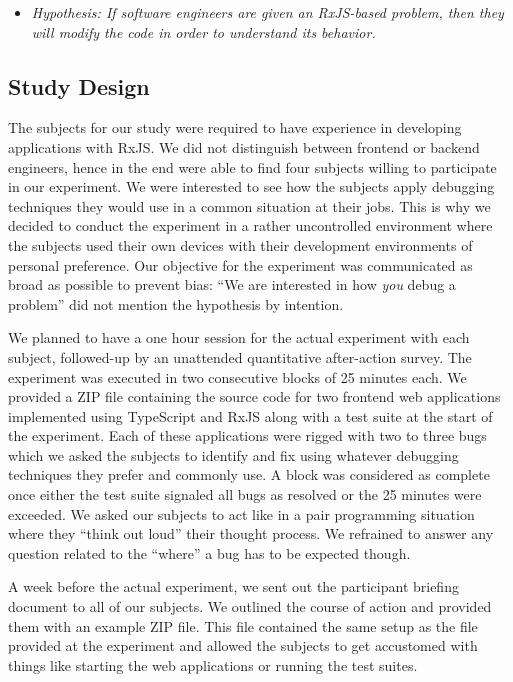 \documentclass[12pt,a4paper]{article}
\begin{document}
\begin{itemize}
	\item \emph{Hypothesis: If software engineers are given an RxJS-based problem, then they will modify the code in order to understand its behavior.}
\end{itemize}

\subsection{Study Design}

The subjects for our study were required to have experience in developing applications with RxJS. We did not distinguish between frontend or backend engineers, hence in the end were able to find four subjects willing to participate in our experiment. We were interested to see how the subjects apply debugging techniques they would use in a common situation at their jobs. This is why we decided to conduct the experiment in a rather uncontrolled environment where the subjects used their own devices with their development environments of personal preference. Our objective for the experiment was communicated as broad as possible to prevent bias: ``We are interested in how \emph{you} debug a problem'' did not mention the hypothesis by intention.

We planned to have a one hour session for the actual experiment with each subject, followed-up by an unattended quantitative after-action survey. The experiment was executed in two consecutive blocks of 25 minutes each. We provided a ZIP file containing the source code for two frontend web applications implemented using TypeScript and RxJS along with a test suite at the start of the experiment. Each of these applications were rigged with two to three bugs which we asked the subjects to identify and fix using whatever debugging techniques they prefer and commonly use. A block was considered as complete once either the test suite signaled all bugs as resolved or the 25 minutes were exceeded. We asked our subjects to act like in a pair programming situation where they ``think out loud'' their thought process. We refrained to answer any question related to the ``where'' a bug has to be expected though.

A week before the actual experiment, we sent out the participant briefing document to all of our subjects. We outlined the course of action and provided them with an example ZIP file. This file contained the same setup as the file provided at the experiment and allowed the subjects to get accustomed with things like starting the web applications or running the test suites.
\end{document}
